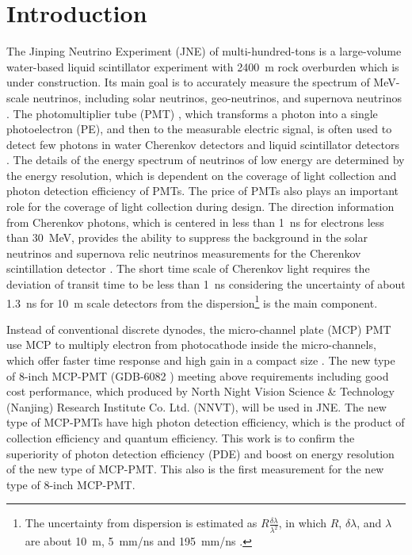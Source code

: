 \section{Introduction}
The Jinping Neutrino Experiment (JNE) of multi-hundred-tons is a large-volume water-based liquid scintillator experiment with \SI{2400}{m} rock overburden \cite{LetterJNE2017} which is under construction. Its main goal is to accurately measure the spectrum of MeV-scale neutrinos, including solar neutrinos, geo-neutrinos, and supernova neutrinos \cite{LetterJNE2017}. %
The photomultiplier tube (PMT) \cite{HAMAMATSUManual}, which transforms a photon into a single photoelectron (PE), and then to the measurable electric signal, is often used to detect few photons in water Cherenkov detectors \cite{SNO,SuperK} and liquid scintillator detectors \cite{KamLAND,JUNO:2015zny}. The details of the energy spectrum of neutrinos of low energy are determined by the energy resolution, which is dependent on the coverage of light collection and photon detection efficiency of PMTs. The price of PMTs also plays an important role for the coverage of light collection during design. The direction information from Cherenkov photons, which is centered in less than \SI{1}{ns} for electrons less than \SI{30}{MeV}, provides the ability to suppress the background in the solar neutrinos and supernova relic neutrinos measurements for the Cherenkov scintillation detector \cite{Guo_2019}. The short time scale of Cherenkov light requires the deviation of transit time to be less than \SI{1}{ns} considering the uncertainty of about \SI{1.3}{ns} for \SI{10}{m} scale detectors from the dispersion\footnote{The uncertainty from dispersion is estimated as $R\frac{\delta\lambda}{\lambda^2}$, in which $R$, $\delta\lambda$, and $\lambda$ are about \SI{10}{m}, \SI{5}{mm/ns} and \SI{195}{mm/ns} \cite{Luo:2022xrd}.} is the main component.

Instead of conventional discrete dynodes, the micro-channel plate (MCP) PMT use MCP to multiply electron from photocathode inside the micro-channels, which offer faster time response and high gain in a compact size \cite{HAMAMATSUManual}. The new type of 8-inch MCP-PMT (GDB-6082 \cite{GDB-6082}) meeting above requirements including good cost performance, which produced by North Night Vision Science \& Technology (Nanjing) Research Institute Co. Ltd. (NNVT), will be used in JNE. The new type of MCP-PMTs have high photon detection efficiency, which is the product of collection efficiency and quantum efficiency. This work is to confirm the superiority of photon detection efficiency (PDE) and boost on energy resolution of the new type of MCP-PMT. This also is the first measurement for the new type of 8-inch MCP-PMT.

